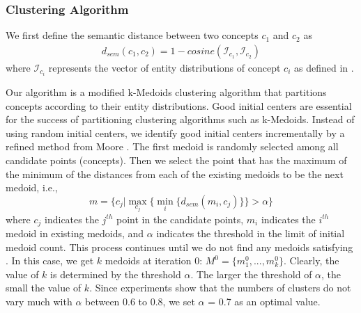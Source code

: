 \subsubsection{Clustering Algorithm}
We first define the semantic distance between two concepts $c_1$ and
$c_2$ as
\begin{equation}
\label{eq:semanticDist}
\begin{aligned}
d_{sem}(c_{1}, c_{2}) = 1-cosine(\mathcal{I}_{c_{1}}, \mathcal{I}_{c_{2}})
\end{aligned}
\end{equation}
where $\mathcal{I}_{c_i}$ represents the vector of entity distributions
of concept $c_i$ as defined in .

Our algorithm is a modified k-Medoids clustering algorithm that partitions concepts according to their entity distributions. Good initial
centers are essential for the success of partitioning clustering algorithms such as k-Medoids. Instead of using random initial centers, we
identify good initial centers incrementally by a refined method from
Moore \cite{Moore:1991}. %
The first medoid is randomly selected among all candidate points
(concepts). Then we select the point that has the maximum of the
minimum of the distances from each of the existing medoids to be the
next medoid, i.e.,
\begin{equation}
m = \{c_j|\max_{c_j}\{\min_{i}\{d_{sem}(m_i,c_j)\} \} > \alpha\}\label{eq:initMedoid}
\end{equation}
where $c_j$ indicates the $j^{th}$ point in the candidate points,
$m_i$ indicates the $i^{th}$ medoid in existing medoids, and $\alpha$ indicates the threshold in the limit of initial medoid count.
This process continues until we do not find any medoids satisfying .
In this case, we get $k$ medoids at iteration 0: $M^{0} = \{m_{1}^{0}, ..., m_{k}^{0}\}$. Clearly, the value of $k$ is determined by the
threshold $\alpha$. The larger the threshold of $\alpha$, the small the value of $k$. Since experiments show that the numbers of clusters do not
vary much with $\alpha$ between 0.6 to 0.8, we set $\alpha$ = 0.7 as an optimal value.

